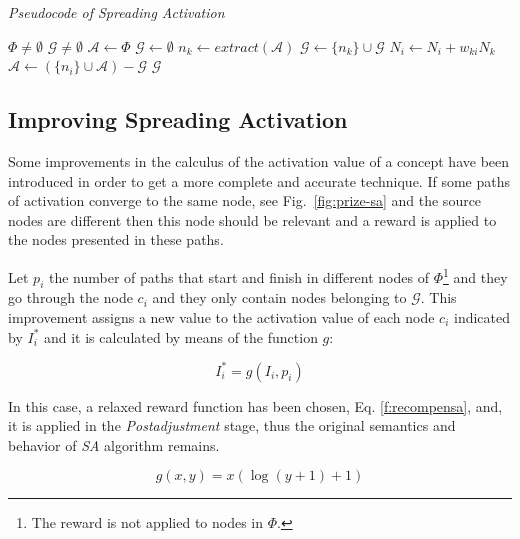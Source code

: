 \begin{algorithm}
\caption{\textit{Pseudocode of Spreading Activation}}
\label{alg:as}
\begin{algorithmic}
  \REQUIRE $\Phi \neq \emptyset$  
  \ENSURE $\mathcal{G} \neq \emptyset$
  \STATE $\mathcal{A} \leftarrow \Phi$
  \STATE $\mathcal{G} \leftarrow \emptyset$
	\STATE $n_k \leftarrow  extract(\mathcal{A})$
	\STATE $\mathcal{G} \leftarrow \{n_k\} \cup \mathcal{G}$	  	
	  	\STATE $N_i \leftarrow N_i + w_{ki}N_k$	
		\STATE $\mathcal{A} \leftarrow (\{n_i\} \cup \mathcal{A}) -
\mathcal{G}$		
	    \ENDFOR
  \ENDWHILE
 \RETURN $\mathcal{G}$
\end{algorithmic}
\end{algorithm}\label{alg:as}

\subsection{Improving Spreading Activation}\label{improve:sa}
Some improvements in the calculus of the activation value of a
concept have been introduced in order to get a more complete and accurate technique. 
If some paths of activation converge to the same node, see Fig.~\ref{fig:prize-sa} and the source nodes are different 
then this node should be relevant and a reward is applied to the nodes presented
in these paths. 

\begin{definition}
Let $p_i$ the number of paths that start and finish in different nodes of
$\Phi$\footnote{The reward is not applied to nodes in  $\Phi$.} and they go
through the node $c_i$ and they only contain nodes belonging to $\mathcal{G}$.
This improvement assigns a new value to the activation value of each node $c_i$
indicated by $I^*_i$ and it is calculated by means of the function $g$:
\end{definition}

\begin{equation}
I^*_i = g(I_i,p_i)
\end{equation}

In this case, a relaxed reward function has been chosen, Eq. \ref{f:recompensa},
and, it is applied in the \textit{Postadjustment} stage, thus the
original semantics and behavior of \textit{SA} algorithm remains. 

\begin{equation}\label{f:recompensa}
g(x,y) = x (\log(y+1)+1)
\end{equation}

